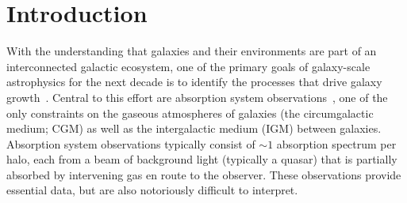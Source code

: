 \documentclass[fleqn,usenatbib]{mnras}
\begin{document}


\section{Introduction}

With the understanding that galaxies and their environments are part of an interconnected galactic ecosystem, one of the primary goals of galaxy-scale astrophysics for the next decade is to identify the processes that drive galaxy growth~\citep{Decadal2020}.
Central to this effort are absorption system observations~\citep[e.g.][]{bahcall1993Hubble, lanzetta1995Gaseous, lauroesch1996QSO, Charlton1996,churchill1996Spatial,Prochaska1997,Rauch1997,Tumlinson2013,Werk2014,Prochaska2017,Kacprzak2019,Lehner2020}, one of the only constraints on the gaseous atmospheres of galaxies (the circumgalactic medium; CGM) as well as the intergalactic medium (IGM) between galaxies.
Absorption system observations typically consist of $\sim 1$ absorption spectrum per halo, each from a beam of background light (typically a quasar) that is partially absorbed by intervening gas en route to the observer.
These observations provide essential data, but are also notoriously difficult to interpret.
\end{document}
